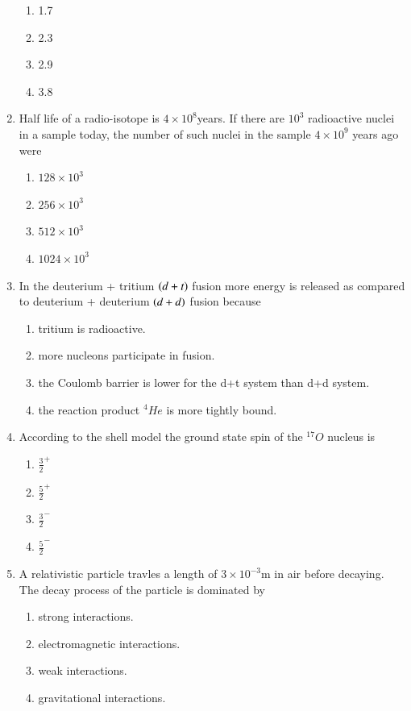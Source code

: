 \documentclass[journal]{IEEEtran}
\numberwithin{equation}{enumi}
\numberwithin{figure}{enumi}
\begin{document}
\begin{enumerate}
		\begin{enumerate}
			\item 1.7
			\item 2.3
			\item 2.9
			\item 3.8
		\end{enumerate}
	\item Half life of a radio-isotope is $4\times10^8$years. If there are $10^3$ radioactive nuclei in a sample today, the number of such nuclei in the sample $4\times10^9$ years ago were
		\begin{enumerate}
			\item $128\times10^3$
			\item $256\times10^3$
			\item $512\times10^3$
			\item $1024\times10^3$
		\end{enumerate}
	\item In the deuterium + tritium $\left(d+t\right)$ fusion more energy is released as compared to deuterium + deuterium $\left(d+d\right)$ fusion because
		\begin{enumerate}
			\item tritium is radioactive.
			\item more nucleons participate in fusion.
			\item the Coulomb barrier is lower for the d+t system than d+d system.
			\item the reaction product $^4He$ is more tightly bound.
		\end{enumerate}
	\item According to the shell model the ground state spin of the $^{17}O$ nucleus is
		\begin{enumerate}
			\item $\frac{3}{2}^+$
			\item $\frac{5}{2}^+$
			\item $\frac{3}{2}^-$
			\item $\frac{5}{2}^-$
		\end{enumerate}
	\item A relativistic particle travles a length of $3\times10^{-3}$m in air before decaying. The decay process of the particle is dominated by
		\begin{enumerate}
			\item strong interactions.
			\item electromagnetic interactions.
			\item weak interactions.
			\item gravitational interactions.

\end{enumerate}
\end{enumerate}
\end{document}
